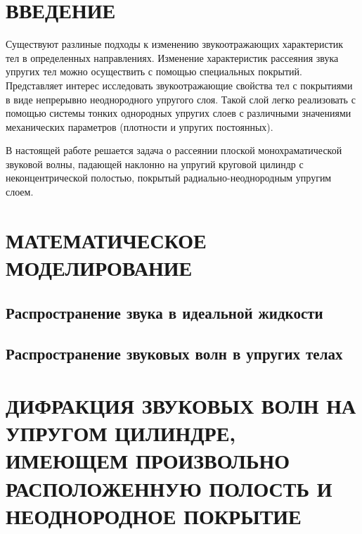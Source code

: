 
 
\renewcommand{\bibname}{СПИСОК ИСПОЛЬЗОВАННЫХ ИСТОЧНИКОВ}
\renewcommand\refname{СПИСОК ИСПОЛЬЗОВАННЫХ ИСТОЧНИКОВ}

%

\setcounter{page}{2}
\thispagestyle {empty}
\renewcommand{\contentsname}{\centering СОДЕРЖАНИЕ}
\tableofcontents

\newpage
\section*{ВВЕДЕНИЕ}

Существуют разлиные подходы к изменению звукоотражающих характеристик тел в определенных направлениях. Изменение характеристик рассеяния звука упругих тел можно осуществить с помощью специальных покрытий. Представляет интерес исследовать звукоотражающие свойства тел с покрытиями в виде непрерывно неоднородного упругого слоя. Такой слой легко реализовать с помощью системы тонких однородных упругих слоев с различными значениями механических параметров (плотности и упругих постоянных).

В настоящей работе решается задача о рассеянии плоской монохраматической звуковой волны, падающей наклонно на упругий круговой цилиндр с неконцентрической полостью, покрытый радиально-неоднородным упругим слоем.

\newpage
\section{МАТЕМАТИЧЕСКОЕ МОДЕЛИРОВАНИЕ}

\newpage
\subsection{Распространение звука в идеальной жидкости}

\newpage
\subsection{Распространение звуковых волн в упругих телах}

\newpage
\section{ДИФРАКЦИЯ ЗВУКОВЫХ ВОЛН НА УПРУГОМ ЦИЛИНДРЕ, ИМЕЮЩЕМ ПРОИЗВОЛЬНО РАСПОЛОЖЕННУЮ ПОЛОСТЬ И НЕОДНОРОДНОЕ ПОКРЫТИЕ}

